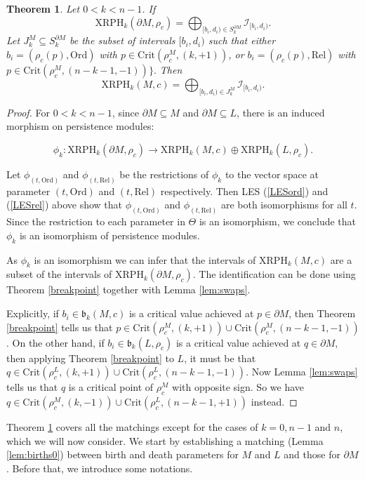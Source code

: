 \documentclass[a4paper,11pt]{article}
\newtheorem{theorem}{Theorem}[section]
\theoremstyle{definition}
\begin{document}
\begin{theorem}\label{thm:k}
Let $0<k< n-1$. 
If $$\text{XRPH}_k(\partial M,\rho_c) = \bigoplus_{[b_i,d_i)\in S_k^{\partial M}} \mathcal{I}_{[b_i,d_i)}.$$ Let $J_k^M\subseteq S_k^{\partial M}$ be the subset of intervals $[b_i,d_i)$ such that  either $b_i = (\rho_c(p),\text{Ord})$ with $p\in\text{Crit}(\rho_c^M,(k,+1))$, or $b_i = (\rho_c(p),\text{Rel})$ with $p\in\text{Crit}(\rho_c^M,(n-k-1,-1))\}.$ 
Then
$$\text{XRPH}_k(M,c) = \bigoplus_{[b_i,d_i)\in J_k^M} \mathcal{I}_{[b_i,d_i)}.$$ 
\end{theorem}
\begin{proof}
For $0<k<n-1$, since $\partial M\subseteq M$ and $\partial M\subseteq L$, there is an induced morphism on persistence modules:

$$\phi_k: \text{XRPH}_k(\partial M,\rho_c)\to\text{XRPH}_k(M,c)\oplus\text{XRPH}_k(L,\rho_c).$$ 

Let $\phi_{(t,\mathrm{Ord})}$ and $\phi_{(t,\mathrm{Rel})}$ be the restrictions of $\phi_k$ to the vector space at parameter $(t, \mathrm{Ord})$ and $(t,\mathrm{Rel})$ respectively. Then LES (\ref{LESord}) and (\ref{LESrel}) above show that $\phi_{(t,\text{Ord})}$ and $\phi_{(t,\text{Rel})}$ are both isomorphisms for all $t$. Since the restriction to each parameter in $\Theta$ is an isomorphism, we conclude that $\phi_k$ is an isomorphism of persistence modules.

As $\phi_k$ is an isomorphism we can infer that the intervals of $\text{XRPH}_k(M,c)$ are a subset of the intervals of  $\text{XRPH}_k(\partial M,\rho_c)$. The identification can be done using Theorem \ref{breakpoint} together with Lemma \ref{lem:swaps}.

Explicitly, if $b_i\in \mathfrak{b}_k(M,c)$ is a critical value achieved at $p\in \partial M$, then Theorem \ref{breakpoint} tells us that $p\in \mathrm{Crit}(\rho_c^M,(k,+1))\cup \mathrm{Crit}(\rho_c^M,(n-k-1,-1))$. On the other hand, if $b_i\in \mathfrak{b}_k(L,\rho_c)$ is a critical value achieved at $q\in \partial M$, then applying Theorem \ref{breakpoint} to $L$, it must be that $q\in \mathrm{Crit}(\rho_c^L,(k,+1))\cup \mathrm{Crit}(\rho_c^L,(n-k-1,-1))$. Now Lemma \ref{lem:swaps} tells us that $q$ is a critical point of $\rho_c^M$ with opposite sign. So we have $q\in \mathrm{Crit}(\rho_c^M,(k,-1))\cup \mathrm{Crit}(\rho_c^L,(n-k-1,+1))$ instead.
\end{proof}

 
Theorem \ref{thm:k} covers all the matchings except for the cases of $k=0, n-1$ and $n$, which we will now consider. We start by establishing a matching (Lemma \ref{lem:births0}) between birth and death parameters for $M$ and $L$ and those for $\partial M$. Before that, we introduce some notations.
\end{document}
